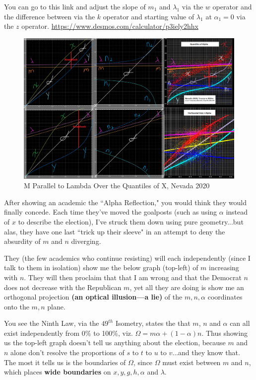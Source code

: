 You can go to this link and adjust the slope of $m_{1}$ and $\lambda_{1}$ via the $w$ operator and the difference between via the $k$ operator and starting value of $\lambda_{1}$ at $\alpha_{1}=0$ via the $z$ operator.
\url{https://www.desmos.com/calculator/p3iely2hhx}
\begin{figure}[bp!]
\begin{center}
\caption{M Parallel to Lambda Over the Quantiles of X, Nevada 2020}
\includegraphics[width=400pt]{Alpha Reflection Theorem, Nevada 2020.png}
\end{center}
\end{figure}
\newpage
After showing an academic the ``Alpha Reflection," you would think they would finally concede. Each time they've moved the goalposts (such as using $\alpha$ instead of $x$ to describe the election), I've struck them down using pure geometry...but alas, they have one last ``trick up their sleeve" in an attempt to deny the absurdity of $m$ and $n$ diverging.

They (the few academics who continue resisting) will each independently (since I talk to them in isolation) show me the below graph (top-left) of $m$ increasing with $n$. They will then proclaim that that I am wrong and that the Democrat $n$ does not decrease with the Republican $m$, yet all they are doing is show me an orthogonal projection \textbf{(an optical illusion---a lie)} of the $m,n,\alpha$ coordinates onto the $m,n$ plane.

You see the Ninth Law, via the $49^{th}$ Isometry, states the that $m$, $n$ and $\alpha$ can all exist independently from 0\% to 100\%, viz. $\Omega=m\alpha+(1-\alpha)n$. Thus showing us the top-left graph doesn't tell us anything about the election, because $m$ and $n$ alone don't resolve the proportions of $s$ to $t$ to $u$ to $v$...and they know that. The most it tells us is the boundaries of $\Omega$, since $\Omega$ must exist between $m$ and $n$, which places \textbf{wide boundaries} on $x,y,g,h,\alpha$ and $\lambda$.

